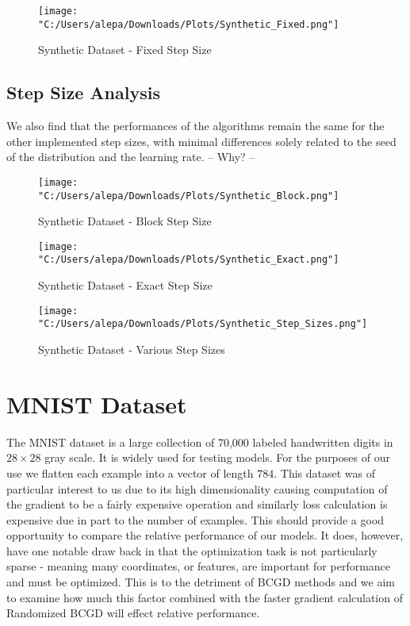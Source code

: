 \documentclass{article}
\begin{document}
\begin{figure}[H]
    \centering
    \texttt{[image: "C:/Users/alepa/Downloads/Plots/Synthetic\_Fixed.png"]}
    \caption{Synthetic Dataset - Fixed Step Size}
    \label{fig:synthetic_fixed}
\end{figure}

\subsection{Step Size Analysis}
We also find that the performances of the algorithms remain the same for the other implemented step sizes, with minimal differences solely related to the seed of the distribution and the learning rate. -- Why? --

\begin{figure}[H]
    \centering
    \texttt{[image: "C:/Users/alepa/Downloads/Plots/Synthetic\_Block.png"]}
    \caption{Synthetic Dataset - Block Step Size}
    \label{fig:synthetic_block}
\end{figure}

\begin{figure}[H]
    \centering
    \texttt{[image: "C:/Users/alepa/Downloads/Plots/Synthetic\_Exact.png"]}
    \caption{Synthetic Dataset - Exact Step Size}
    \label{fig:synthetic_exact}
\end{figure}

\begin{figure}[H]
    \centering
    \texttt{[image: "C:/Users/alepa/Downloads/Plots/Synthetic\_Step\_Sizes.png"]}
    \caption{Synthetic Dataset - Various Step Sizes}
    \label{fig:synthetic_step_sizes}
\end{figure}


\section{MNIST Dataset}
The MNIST dataset is a large collection of 70,000 labeled handwritten digits in $28\times28$ gray scale. It is widely used for testing models. For the purposes of our use we flatten each example into a vector of length $784$. This dataset was of particular interest to us due to its high dimensionality causing computation of the gradient to be a fairly expensive operation and similarly loss calculation is expensive due in part to the number of examples. This should provide a good opportunity to compare the relative performance of our models. It does, however, have one notable draw back in that the optimization task is not particularly sparse - meaning many coordinates, or features, are important for performance and must be optimized. This is to the detriment of BCGD methods and we aim to examine how much this factor combined with the faster gradient calculation of Randomized BCGD will effect relative performance.
\end{document}
